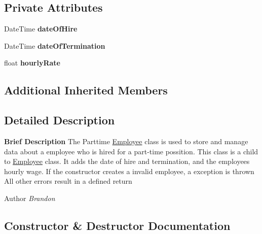 \subsection*{Private Attributes}
\begin{DoxyCompactItemize}
\item 
\hypertarget{class_all_employees_1_1_parttime_employee_ae9217b6e9531dd5f6ac9029982bab405}{}Date\+Time {\bfseries date\+Of\+Hire}\label{class_all_employees_1_1_parttime_employee_ae9217b6e9531dd5f6ac9029982bab405}

\item 
\hypertarget{class_all_employees_1_1_parttime_employee_a98a60c754150cb7ff049b1a6f9eea5bc}{}Date\+Time {\bfseries date\+Of\+Termination}\label{class_all_employees_1_1_parttime_employee_a98a60c754150cb7ff049b1a6f9eea5bc}

\item 
\hypertarget{class_all_employees_1_1_parttime_employee_abbd98191b1a250e7910012c51f85bcea}{}float {\bfseries hourly\+Rate}\label{class_all_employees_1_1_parttime_employee_abbd98191b1a250e7910012c51f85bcea}

\end{DoxyCompactItemize}
\subsection*{Additional Inherited Members}


\subsection{Detailed Description}
{\bfseries Brief Description} The Parttime \hyperlink{class_all_employees_1_1_employee}{Employee} class is used to store and manage data about a employee who is hired for a part-\/time possition. This class is a child to \hyperlink{class_all_employees_1_1_employee}{Employee} class. It adds the date of hire and termination, and the employees hourly wage. If the constructor creates a invalid employee, a exception is thrown All other errors result in a defined return 

\begin{DoxyAuthor}{Author}
{\itshape Brandon} 
\end{DoxyAuthor}


\subsection{Constructor \& Destructor Documentation}
\hypertarget{class_all_employees_1_1_parttime_employee_aefdb20ed1cc9fb007068380a97e3f51e}{}
